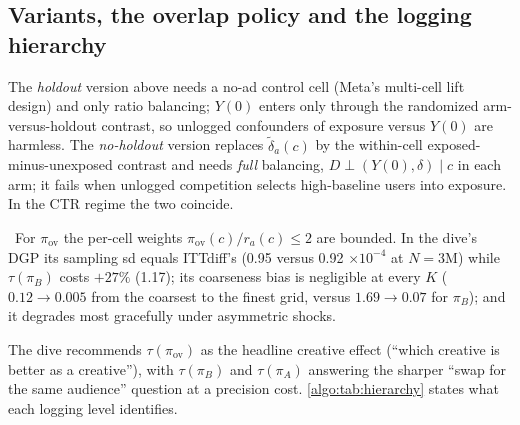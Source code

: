 \subsection{Variants, the overlap policy and the logging hierarchy}

The \emph{holdout} version above needs a no-ad control cell (Meta's multi-cell lift design) and only ratio balancing; $Y(0)$ enters only through the randomized arm-versus-holdout contrast, so unlogged confounders of exposure versus $Y(0)$ are harmless. The \emph{no-holdout} version replaces $\tilde\delta_a(c)$ by the within-cell exposed-minus-unexposed contrast and needs \emph{full} balancing, $D \perp (Y(0), \delta) \mid c$ in each arm; it fails when unlogged competition selects high-baseline users into exposure. In the CTR regime the two coincide.

\begin{proposition}
\label{algo:prop:overlap}
\tagNumerical\ For $\pi_{\mathrm{ov}}$ the per-cell weights $\pi_{\mathrm{ov}}(c)/r_a(c) \le 2$ are bounded. In the dive's DGP its sampling sd equals ITTdiff's (0.95 versus 0.92 $\times10^{-4}$ at $N = 3$M) while $\tau(\pi_B)$ costs $+27\%$ (1.17); its coarseness bias is negligible at every $K$ ($0.12 \to 0.005$ from the coarsest to the finest grid, versus $1.69 \to 0.07$ for $\pi_B$); and it degrades most gracefully under asymmetric shocks.
\end{proposition}

The dive recommends $\tau(\pi_{\mathrm{ov}})$ as the headline creative effect (``which creative is better as a creative''), with $\tau(\pi_B)$ and $\tau(\pi_A)$ answering the sharper ``swap for the same audience'' question at a precision cost. \cref{algo:tab:hierarchy} states what each logging level identifies.

